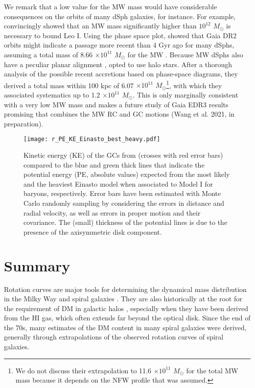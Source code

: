 \documentclass{aa}
\begin{document}
We remark that a low value for the MW mass would have considerable consequences on the orbits of many dSph galaxies, for instance. For example, \citet{Boylan-Kolchin2013} convincingly showed that an MW mass significantly higher than $10^{12}$ $M_{\odot}$ is necessary to bound Leo I.  Using the
\citet{Boylan-Kolchin2013} phase space plot, \citet{Hammer2020} showed that Gaia DR2 orbits might indicate a passage more recent than 4 Gyr ago for many dSphs, assuming a total mass of 8.66 $\times 10^{11}$ $M_{\odot}$ for the MW \citep{Eilers2019}. Because MW dSphs  also have a peculiar planar alignment \citep{Pawlowski2014}, \citet{Deason2020} opted to use halo stars. After a thorough analysis of the possible recent accretions based on phase-space diagrams,  they  derived a total mass within 100 kpc of 6.07 $\times 10^{11}$ $M_{\odot}$\footnote{We do not  discuss their extrapolation to 11.6 $\times 10^{11}$ $M_{\odot}$ for the total MW mass because it depends on the NFW profile that was assumed.}, with which they associated systematics up to 1.2 $\times 10^{11}$ $M_{\odot}$.  This is only marginally consistent with a very low MW mass and makes a future study of Gaia EDR3 results promising that combines the MW RC and GC motions (Wang et al. 2021, in preparation). 

\begin{figure}
\texttt{[image: r\_PE\_KE\_Einasto\_best\_heavy.pdf]}
\caption{Kinetic energy (KE) of the GCs from \citet{Vasiliev2019} (crosses with red error bars) compared to the blue and green thick lines that indicate the potential energy (PE, absolute values) expected from the most likely and the heaviest Einasto model when associated to Model I for baryons, respectively. Error bars have been estimated with Monte Carlo randomly sampling by considering the errors in distance and radial velocity,  as well as errors in proper motion and their covariance. The (small) thickness of the potential lines is due to the presence of the axisymmetric disk component.}
    \label{fig:GCs}
\end{figure}


\section{Summary}
Rotation curves are major tools for determining the dynamical mass distribution in the Milky Way and spiral galaxies \citep{Sofue2013}. They are also historically at the root for the requirement of DM in galactic halos \citep{Bosma1978,Rubin1980}, especially when they have been derived from the HI gas, which often extends far beyond the optical disk. Since the end of the 70s, many estimates of the DM content in many spiral galaxies were derived, generally through extrapolations of the observed rotation curves of spiral galaxies.%
\end{document}
